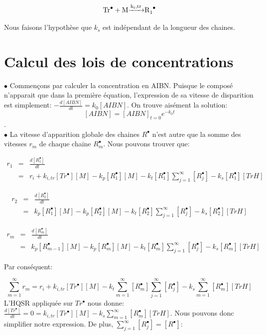 \documentclass[a4paper,oneside,12pt]{article}
\begin{document}
\begin{equation}
\ce{Tr^{\bullet} + M \xrightarrow{k_i,tr} R_{1}^{\bullet}}
\end{equation}

Nous faisons l'hypothèse que $k_s$ est indépendant de la longueur des chaines.

\section{Calcul des lois de concentrations}
$\bullet$ Commençons par calculer la concentration en AIBN. Puisque le composé n'apparait que dans la première équation, l'expression de sa vitesse de disparition est simplement: $-\frac{d[AIBN]}{dt}=k_{0}[AIBN]$. On trouve aisément la solution: $$[AIBN]=[AIBN]_{t=0}e^{-k_{0}t} $$.\\

$\bullet$ La vitesse d'apparition globale des chaines $R^{\bullet}$ n'est autre que la somme des vitesses $r_{m}$ de chaque chaine $R_{m}^{\bullet}$. Nous pouvons trouver que:

\begin{eqnarray*}
r_{1} &=& \frac{d[R_{1}^{\bullet}]}{dt}\\
      &=& r_{i}+k_{i,tr}[Tr^{\bullet}][M]-k_p[R_{1}^{\bullet}][M]-k_{t}[R_1^{\bullet}]\sum\limits_{j=1}^\infty[R_j^{\bullet}]-k_{s}[R_{1}^{\bullet}][TrH]
\end{eqnarray*}

\begin{eqnarray*}
r_{2} &=& \frac{d[R_{2}^{\bullet}]}{dt}\\
	&=& k_p[R_{1}^{\bullet}][M]-k_p[R_{2}^{\bullet}][M]-k_{t}[R_2^{\bullet}]\sum\limits_{j=1}^\infty[R_j^{\bullet}]-k_{s}[R_{2}^{\bullet}][TrH]
\end{eqnarray*}

\begin{eqnarray*}
r_{m} &=& \frac{d[R_{m}^{\bullet}]}{dt}\\
      &=& k_p[R_{m-1}^{\bullet}][M]-k_p[R_{m}^{\bullet}][M]-k_{t}[R_m^{\bullet}]\sum\limits_{j=1}^\infty[R_j^{\bullet}]-k_{s}[R_{m}^{\bullet}][TrH]
\end{eqnarray*}

Par conséquent:

\begin{equation}
\sum\limits_{m=1}^\infty r_{m}=r_i+ k_{i,tr}[Tr^{\bullet}][M] -k_{t}\sum\limits_{m=1}^\infty [R_m^{\bullet}] \sum\limits_{j=1}^\infty[R_j^{\bullet}]-k_{s}\sum\limits_{m=1}^\infty[R_{m}^{\bullet}][TrH]
\end{equation}
L'HQSR appliquée sur $Tr^{\bullet}$ nous donne: $\frac{d[Tr^{\bullet}]}{dt}=0=k_{i,tr}[Tr^{\bullet}][M]-k_{s}\sum\limits_{m=1}^\infty[R_{m}^{\bullet}][TrH]$. Nous pouvons donc simplifier notre expression. De plus, $\sum\limits_{j=1}^\infty[R_j^{\bullet}] = [R^{\bullet}]$:
\end{document}
